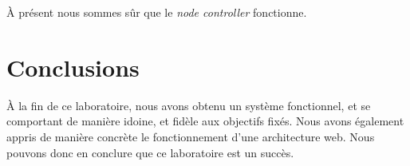 \documentclass[a4paper,11pt,titlepage]{article}
\begin{document}
À présent nous sommes sûr que le \emph{node controller} fonctionne.

\section{Conclusions}
À la fin de ce laboratoire, nous avons obtenu un système fonctionnel, et se comportant de manière idoine, et fidèle aux
objectifs fixés. Nous avons également appris de manière concrète le fonctionnement d'une architecture web. Nous pouvons
donc en conclure que ce laboratoire est un succès.
\end{document}
